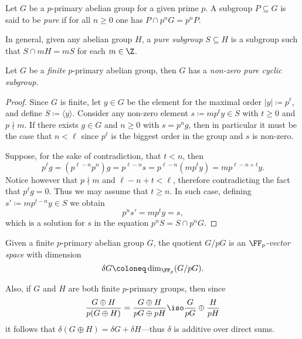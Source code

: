 \begin{definition}
    \label{def:pure-subgroup}
    Let \(G\) be a \(p\)-primary abelian group for a given prime \(p\). A subgroup
    \(P \subseteq G\) is said to be \emph{pure} if for all \(n \geq 0\) one has
    \(P \cap p^n G = p^n P\).

    In general, given any abelian group \(H\), a \emph{pure subgroup}
    \(S \subseteq H\) is a subgroup such that \(S \cap m H = m S\) for each
    \(m \in \Z\).
\end{definition}

\begin{lemma}
    \label{lem:finite-p-primary-has-pure-cyclic-subgrp}
    Let \(G\) be a \emph{finite} \(p\)-primary abelian group, then \(G\) has a
    \emph{non-zero pure cyclic subgroup}.
\end{lemma}

\begin{proof}
    Since \(G\) is finite, let \(y \in G\) be the element for the maximal order
    \(|y| \coloneq p^{\ell}\), and define \(S \coloneq \langle y \rangle\). Consider
    any non-zero element \(s \coloneq m p^t y \in S\) with \(t \geq 0\) and
    \(p \nmid m\). If there exists \(g \in G\) and \(n \geq 0\) with \(s = p^n g\),
    then in particular it must be the case that \(n < \ell\) since \(p^{\ell}\) is
    the biggest order in the group and \(s\) is non-zero.

    Suppose, for the sake of contradiction, that \(t < n\), then
    \[
        p^\ell g = (p^{\ell - n} p^n) g = p^{\ell - n} s = p^{\ell - n} (m p^t y) = m
        p^{\ell - n + t} y.
    \]
    Notice however that \(p \nmid m\) and \(\ell - n + t < \ell\), therefore
    contradicting the fact that \(p^{\ell} g = 0\). Thus we may assume that
    \(t \geq n\). In such case, defining \(s' \coloneq m p^{t-n} y \in S\) we obtain
    \[
        p^n s' = m p^t y = s,
    \]
    which is a solution for \(s\) in the equation \(p^n S = S \cap p^n G\).
\end{proof}

\begin{definition}
    \label{def:finite-p-primary-quotiented-is-Fp-vector-space}
    Given a finite \(p\)-primary abelian group \(G\), the quotient \(G/pG\) is an
    \emph{\(\FF_p\)-vector space} with dimension
    \[
        \delta G \coloneq \dim_{\FF_p}(G/pG).
    \]
\end{definition}

Also, if \(G\) and \(H\) are both finite \(p\)-primary groups, then since
\[
    \frac{G \oplus H}{p(G \oplus H)} = \frac{G \oplus H}{p G \oplus p H}
    \iso \frac{G}{p G} \oplus \frac{H}{p H}
\]
it follows that \(\delta(G \oplus H) = \delta G + \delta H\)---thus \(\delta\)
is additive over direct sums.

